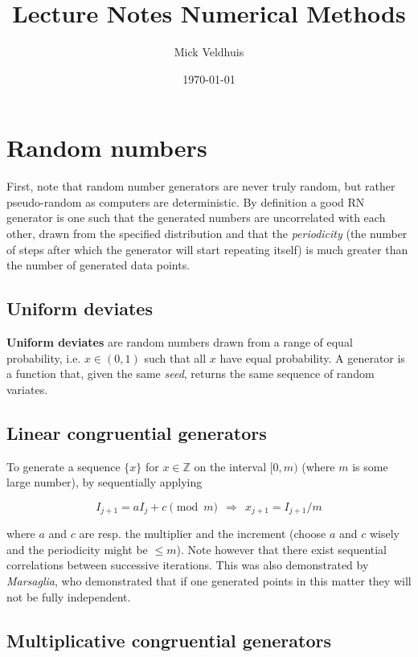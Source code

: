 \documentclass[a4paper]{article}
\title{Lecture Notes Numerical Methods}
\author{Mick Veldhuis}
\date{\today}
\newcommand{\Z}{\mathbb{Z}}
\begin{document}
\maketitle

\tableofcontents

\section{Random numbers}

First, note that random number generators are never truly random, but rather pseudo-random as computers are deterministic. By definition a good RN generator is one such that the generated numbers are uncorrelated with each other, drawn from the specified distribution and that the \textit{periodicity} (the number of steps after which the generator will start repeating itself) is much greater than the number of generated data points.

\subsection{Uniform deviates}

\textbf{Uniform deviates} are random numbers drawn from a range of equal probability, i.e. $x\in(0, 1)$ such that all $x$ have equal probability. A generator is a function that, given the same \textit{seed}, returns the same sequence of random variates.

\subsection{Linear congruential generators}

To generate a sequence $\{x\}$ for $x\in\Z$ on the interval $[0, m)$ (where $m$ is some large number), by sequentially applying

\begin{equation*}
    I_{j+1}=aI_j+c \pmod{m}\ \ \Rightarrow\ \ x_{j+1}=I_{j+1}/m
\end{equation*}

where $a$ and $c$ are resp. the multiplier and the increment (choose $a$ and $c$ wisely and the periodicity might be $\le m$). Note however that there exist sequential correlations between successive iterations. This was also demonstrated by \textit{Marsaglia}, who demonstrated that if one generated points in this matter they will not be fully independent.

\subsection{Multiplicative congruential generators}
\end{document}
